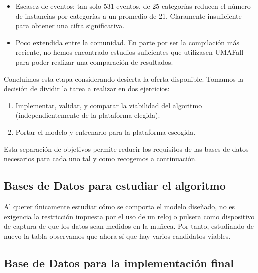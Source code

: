 \begin{itemize}
  \item Escasez de eventos: tan solo 531 eventos, de 25 categorías reducen el número de instancias por categorías a un promedio de 21. Claramente insuficiente para obtener una cifra significativa.
  \item Poco extendida entre la comunidad. En parte por ser la compilación más reciente, no hemos encontrado estudios suficientes que utilizasen UMAFall para poder realizar una comparación de resultados.
\end{itemize}
Concluimos esta etapa considerando desierta la oferta disponible. Tomamos la decisión de dividir la tarea a realizar en dos ejercicios:
\begin{enumerate}
  \item Implementar, validar, y comparar la viabilidad del algoritmo (independientemente de la plataforma elegida).
  \item Portar el modelo y entrenarlo para la plataforma escogida. 
\end{enumerate}

Esta separación de objetivos permite reducir los requisitos de las bases de datos necesarios para cada uno tal y como recogemos a continuación.


\subsection{Bases de Datos para estudiar el algoritmo}

Al querer únicamente estudiar cómo se comporta el modelo diseñado, no es exigencia la restricción impuesta por el uso de un reloj o pulsera como dispositivo de captura de que los datos sean medidos en la muñeca. Por tanto, estudiando de nuevo la tabla  observamos que ahora sí que hay varios candidatos viables.


\subsection{Base de Datos para la implementación final}

